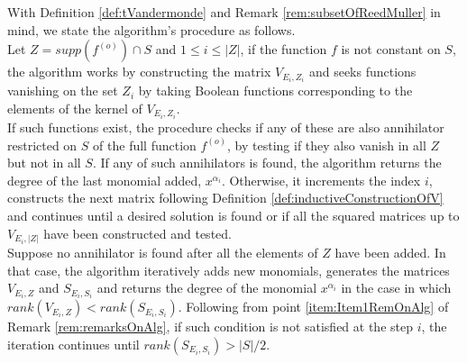 \documentclass[11pt]{llncs}
\begin{document}
With Definition \ref{def:tVandermonde} and Remark \ref{rem:subsetOfReedMuller} in mind, we state the algorithm's procedure as follows.\\
Let $Z = supp\left(f^{(o)}\right) \cap S$ and $1\leq i \leq |Z|$, if the function $f$ is not constant on $S$, the algorithm works by constructing the matrix $V_{E_i, Z_i}$ and seeks functions vanishing on the set $Z_i$ by taking Boolean functions corresponding to the elements of the kernel of $V_{E_i, Z_i}$.\\
If such functions exist, the procedure checks if any of these are also annihilator restricted on $S$ of the full function $f^{(o)}$, by testing if they also vanish in all $Z$ but not in all $S$. If any of such annihilators is found, the algorithm returns the degree of the last monomial added, $x^{\alpha_i}$. Otherwise, it increments the index $i$, constructs the next matrix following Definition \ref{def:inductiveConstructionOfV} and continues until a desired solution is found or if all the squared matrices up to $V_{E_i, |Z|}$ have been constructed and tested.\\
Suppose no annihilator is found after all the elements of $Z$ have been added. In that case, the algorithm iteratively adds new monomials, generates the matrices $V_{E_i, Z}$ and $S_{E_i, S_i}$ and returns the degree of the monomial $x^{\alpha_i}$ in the case in which $rank\left(V_{E_i, Z}\right) < rank\left(S_{E_i, S_i}\right)$. Following from point \ref{item:Item1RemOnAlg} of Remark \ref{rem:remarksOnAlg}, if such condition is not satisfied at the step $i$, the iteration continues until $rank\left(S_{E_i, S_i}\right) > |S| / 2$.\\
\end{document}
